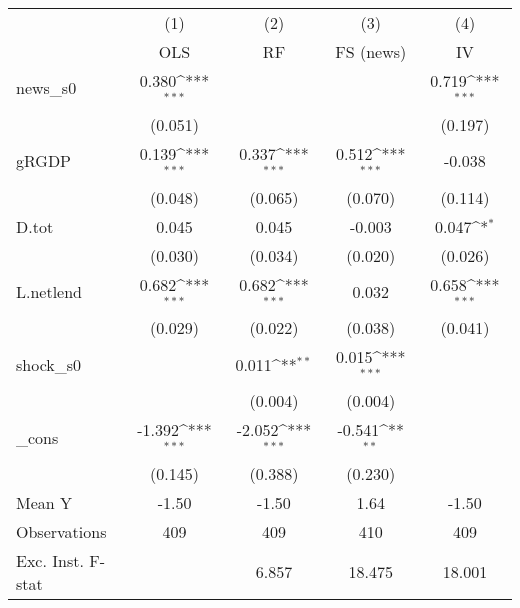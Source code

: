 {
\def\sym#1{\ifmmode^{#1}\else\(^{#1}\)\fi}
\begin{tabular}{l*{4}{c}}
\toprule
            &\multicolumn{1}{c}{(1)}&\multicolumn{1}{c}{(2)}&\multicolumn{1}{c}{(3)}&\multicolumn{1}{c}{(4)}\\
            &\multicolumn{1}{c}{OLS}&\multicolumn{1}{c}{RF}&\multicolumn{1}{c}{FS (news)}&\multicolumn{1}{c}{IV}\\
\midrule
news\_s0     &       0.380\sym{***}&                     &                     &       0.719\sym{***}\\
            &     (0.051)         &                     &                     &     (0.197)         \\
\addlinespace
gRGDP       &       0.139\sym{***}&       0.337\sym{***}&       0.512\sym{***}&      -0.038         \\
            &     (0.048)         &     (0.065)         &     (0.070)         &     (0.114)         \\
\addlinespace
D.tot       &       0.045         &       0.045         &      -0.003         &       0.047\sym{*}  \\
            &     (0.030)         &     (0.034)         &     (0.020)         &     (0.026)         \\
\addlinespace
L.netlend   &       0.682\sym{***}&       0.682\sym{***}&       0.032         &       0.658\sym{***}\\
            &     (0.029)         &     (0.022)         &     (0.038)         &     (0.041)         \\
\addlinespace
shock\_s0    &                     &       0.011\sym{**} &       0.015\sym{***}&                     \\
            &                     &     (0.004)         &     (0.004)         &                     \\
\addlinespace
\_cons      &      -1.392\sym{***}&      -2.052\sym{***}&      -0.541\sym{**} &                     \\
            &     (0.145)         &     (0.388)         &     (0.230)         &                     \\
\midrule
Mean Y      &       -1.50         &       -1.50         &        1.64         &       -1.50         \\
Observations&         409         &         409         &         410         &         409         \\
Exc. Inst. F-stat&                     &       6.857         &      18.475         &      18.001         \\
\bottomrule
\end{tabular}
}
